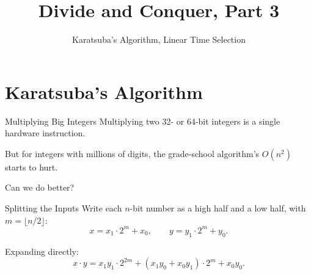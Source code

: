 \documentclass[10pt,aspectratio=169]{beamer}
\title{Divide and Conquer, Part 3}
\subtitle{Karatsuba's Algorithm, Linear Time Selection}
\date{}
\author{}
\begin{document}
\maketitle

\section{Karatsuba's Algorithm}

\begin{frame}{Multiplying Big Integers}
  Multiplying two 32- or 64-bit integers is a single hardware instruction.

  \bigskip
  But for integers with \alert{millions of digits}, the grade-school algorithm's $O(n^2)$ starts to hurt.

  \bigskip
  \begin{center}
  \end{center}

  \bigskip
  \begin{center}
    Can we do better?
  \end{center}
\end{frame}

\begin{frame}{Splitting the Inputs}
  Write each $n$-bit number as a high half and a low half, with $m = \lfloor n/2 \rfloor$:
  \[
    x = x_1 \cdot 2^m + x_0,
    \qquad
    y = y_1 \cdot 2^m + y_0.
  \]

  \bigskip
  \begin{center}
  \end{center}

  \pause

  \bigskip
  Expanding directly:
  \[
    x \cdot y = x_1 y_1 \cdot 2^{2m} + (x_1 y_0 + x_0 y_1)\cdot 2^m + x_0 y_0.
  \]
\end{frame}
\end{document}
